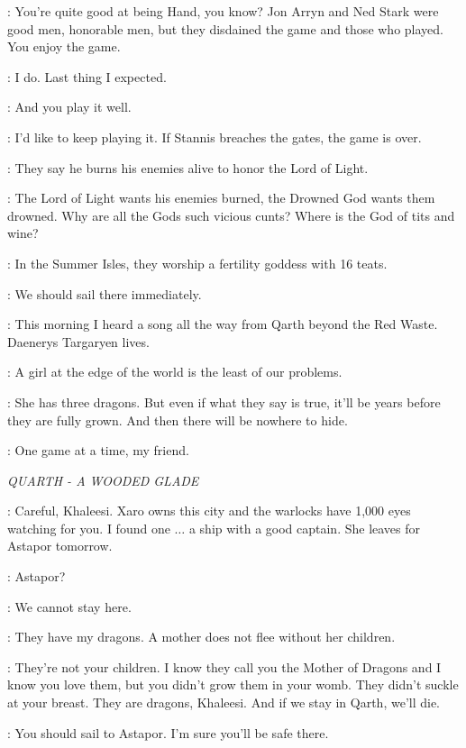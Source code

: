 \VARYS: You're quite good at being Hand, you know? Jon Arryn and Ned Stark were good men, honorable men, but they disdained the game and those who played. You enjoy the game. 

\TYRION: I do. Last thing I expected. 

\VARYS: And you play it well. 

\TYRION: I'd like to keep playing it. If Stannis breaches the gates, the game is over. 

\VARYS: They say he burns his enemies alive to honor the Lord of Light. 

\TYRION: The Lord of Light wants his enemies burned, the Drowned God wants them drowned. Why are all the Gods such vicious cunts? Where is the God of tits and wine? 

\VARYS: In the Summer Isles, they worship a fertility goddess with 16 teats. 

\TYRION: We should sail there immediately. 

\VARYS: This morning I heard a song all the way from Qarth beyond the Red Waste. Daenerys Targaryen lives. 

\TYRION: A girl at the edge of the world is the least of our problems. 

\VARYS: She has three dragons. But even if what they say is true, it'll be years before they are fully grown. And then there will be nowhere to hide. 

\TYRION: One game at a time, my friend. 


\scene

\textit{QUARTH - A WOODED GLADE} 


\JORAH: Careful, Khaleesi. Xaro owns this city and the warlocks have 1,000 eyes watching for you. I found one $\ldots$ a ship with a good captain. She leaves for Astapor tomorrow. 

\DAENERYS: Astapor? 

\JORAH: We cannot stay here. 

\DAENERYS: They have my dragons. A mother does not flee without her children. 

\JORAH: They're not your children. I know they call you the Mother of Dragons and I know you love them, but you didn't grow them in your womb. They didn't suckle at your breast. They are dragons, Khaleesi. And if we stay in Qarth, we'll die. 

\DAENERYS: You should sail to Astapor. I'm sure you'll be safe there. 

